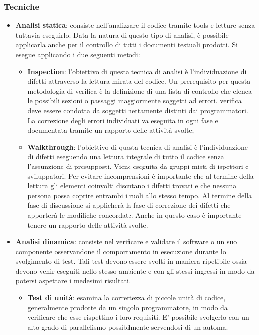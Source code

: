 \subsubsection {Tecniche}
\begin{itemize}
\item \textbf{Analisi statica}: consiste nell’analizzare il codice tramite tools e letture senza tuttavia eseguirlo. Data la natura di questo tipo di analisi, è possibile applicarla anche per il controllo di tutti i documenti testuali prodotti.
Si esegue applicando i due seguenti metodi:
\begin{itemize}
\item \textbf{Inspection}: l’obiettivo di questa tecnica di analisi è l’individuazione di
difetti attraverso la lettura mirata del codice. Un prerequisito per questa metodologia di verifica è la definizione di una lista di controllo che
elenca le possibili sezioni o passaggi maggiormente soggetti ad errori.  verifica deve essere condotta da soggetti nettamente distinti dai programmatori. La correzione degli errori individuati va eseguita in ogni fase e documentata tramite un rapporto delle attività svolte;

\item \textbf{Walkthrough}: l'obiettivo di questa tecnica di analisi è l'individuazione di difetti eseguendo una lettura integrale di tutto il codice senza l'assunzione di presupposti. Viene eseguita da gruppi misti di ispettori e sviluppatori.
Per evitare incomprensioni è importante che al termine della lettura gli elementi coinvolti discutano i difetti trovati e che nessuna persona possa coprire entrambi i ruoli allo stesso tempo.
 Al termine della fase di discussione si applicherà la fase di correzione dei difetti che apporterà le modifiche concordate. 
Anche in questo caso è importante tenere un rapporto delle attività svolte.
\end{itemize}

\item \textbf{Analisi dinamica}: consiste nel verificare e validare il software o un suo componente osservandone il comportamento in esecuzione durante lo svolgimento di test. Tali test devono essere svolti in maniera ripetibile ossia devono venir eseguiti nello stesso ambiente e con gli stessi ingressi in modo da potersi  aspettare i medesimi risultati.
\begin{itemize}
\item \textbf{Test di unità}: esamina la correttezza di piccole unità di codice, generalmente prodotte da un singolo programmatore, in modo da verificare che esse rispettino i loro requisiti. E' possibile svolgerlo con un alto grado di parallelismo possibilmente servendosi di un automa.


\end{itemize}
\end{itemize}
